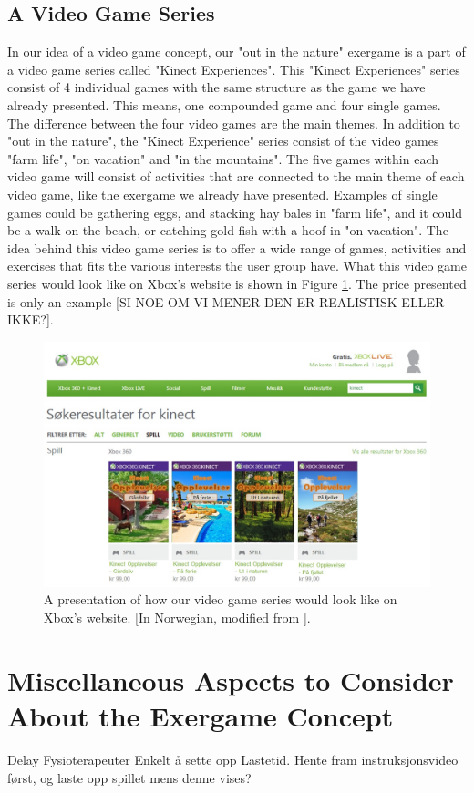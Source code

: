 \subsection{A Video Game Series}
In our idea of a video game concept, our "out in the nature" exergame is a part of a video game series called "Kinect Experiences". This "Kinect Experiences" series consist of 4 individual games with the same structure as the game we have already presented. This means, one compounded game and four single games. The difference between the four video games are the main themes. In addition to "out in the nature", the "Kinect Experience" series consist of the video games "farm life", "on vacation" and "in the mountains". The five games within each video game will consist of activities that are connected to the main theme of each video game, like the exergame we already have presented. Examples of single games could be gathering eggs, and stacking hay bales in "farm life", and it could be a walk on the beach, or catching gold fish with a hoof in "on vacation". The idea behind this video game series is to offer a wide range of games, activities and exercises that fits the various interests the user group have. What this video game series would look like on Xbox's website is shown in Figure \ref{fig:videogameseriesHele}. The price presented is only an example [SI NOE OM VI MENER DEN ER REALISTISK ELLER IKKE?].  

\begin{figure} [H]
\centering
\includegraphics[scale=0.5, angle=90]{SpillXboxNYNY.jpg}
\caption[Presentation of our video game series]{A presentation of how our video game series would look like on Xbox's website. [In Norwegian, modified from \cite{XboxNettside}].}
\label{fig:videogameseriesHele}
\end{figure}

\section{Miscellaneous Aspects to Consider About the Exergame Concept}
\label{sec:misc}

Delay
Fysioterapeuter
Enkelt å sette opp
Lastetid. Hente fram instruksjonsvideo først, og laste opp spillet mens denne vises?

